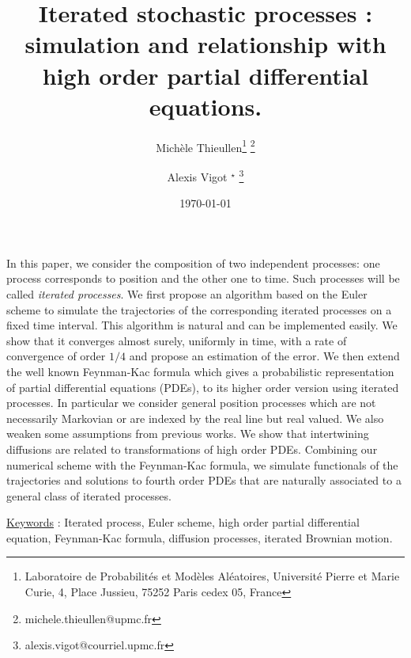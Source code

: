 \documentclass[a4paper, 11pt]{article}
\title{Iterated stochastic processes : simulation and relationship with high order partial differential equations.}
\author{Mich\`ele Thieullen\thanks{Laboratoire de Probabilit\'es et Mod\`eles Al\'eatoires, Universit\'e Pierre et Marie Curie,  4, Place Jussieu, 75252 Paris cedex 05, France}{ } \thanks{michele.thieullen@upmc.fr}\\
\and Alexis Vigot $\text{}^\star$ \thanks{alexis.vigot@courriel.upmc.fr }\\
}
\date{\today}
\newcommand{\1}{\mathbf{1}}
\begin{document}
\maketitle
\bigskip
{\small In this paper, we consider the composition of two independent processes: one process corresponds to position and the other one to time. Such processes will be called {\it iterated processes}. We first propose an algorithm based on the Euler scheme to simulate the trajectories of the corresponding iterated processes on a fixed time interval. 
This algorithm is natural and can be implemented easily. We show that it converges almost surely, uniformly in time, with a rate of convergence of order $1/4$ and propose an estimation of the error. 
We then extend the well known Feynman-Kac formula which gives a probabilistic representation of partial differential equations (PDEs), to its higher order version using iterated processes. In particular we consider general position processes which are not necessarily Markovian or are indexed by the real line but real valued. We also weaken some assumptions from previous works. We show that intertwining diffusions are related to transformations of high order PDEs. Combining our numerical scheme with the Feynman-Kac formula, we simulate functionals of the trajectories and solutions to fourth order PDEs that are naturally associated to a general class of iterated processes.

\bigskip
\noindent \underline{Keywords} : Iterated process, Euler scheme, high order partial differential equation, Feynman-Kac formula, diffusion processes, iterated Brownian motion.}


\newpage
\end{document}

